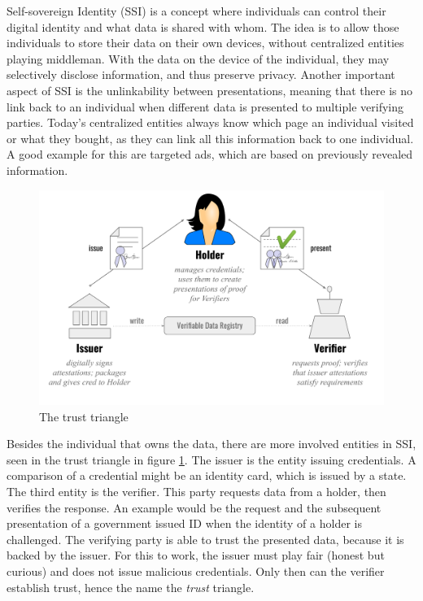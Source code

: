 \documentclass[
	a4paper               %
	,BCOR=0mm            %
	,bibliography=totoc   %
	,listof=totoc         %
	,monolingual
	,twoside=false
]{bfhthesis}              %
\begin{document}
Self-sovereign Identity (SSI)\cite{self-sovereign-identity} is a concept where individuals can control their digital identity and what data is shared with whom. The idea is to allow those individuals to store their data on their own devices, without centralized entities playing middleman. With the data on the device of the individual, they may selectively disclose information, and thus preserve privacy. Another important aspect of SSI is the unlinkability between presentations, meaning that there is no link back to an individual when different data is presented to multiple verifying parties. Today's centralized entities always know which page an individual visited or what they bought, as they can link all this information back to one individual. A good example for this are targeted ads, which are based on previously revealed information. \\


\begin{figure}[h]
	\centering
	\includegraphics[width=12cm]{./img/trusttriangle.png}
	\caption{The trust triangle\protect\footnotemark}
	\label{fig:trusttringle}
\end{figure}


\newpage
Besides the individual that owns the data, there are more involved entities in SSI, seen in the trust triangle in figure \ref{fig:trusttringle}. The issuer is the entity issuing credentials. A comparison of a credential might be an identity card, which is issued by a state. The third entity is the verifier. This party requests data from a holder, then verifies the response. An example would be the request and the subsequent presentation of a government issued ID when the identity of a holder is challenged. The verifying party is able to trust the presented data, because it is backed by the issuer. For this to work, the issuer must play fair (honest but curious) and does not issue malicious credentials. Only then can the verifier establish trust, hence the name the \textit{trust} triangle. \\
\end{document}
